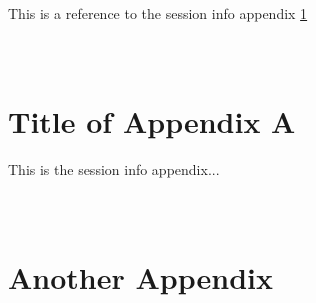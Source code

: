 This is a reference to the session info appendix \ref{app:sessinfo}
\appendix

\section{\\Title of Appendix A}
\label{app:sessinfo}
This is the session info appendix...



\section{\\Another Appendix}


